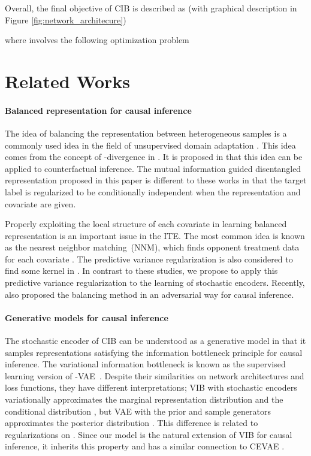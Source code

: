 \documentclass{article}
\begin{document}
    Overall, the final objective of CIB is described as (with graphical description in Figure \ref{fig:network_architecure})
    
    where  involves the following optimization problem
    

\section{Related Works}

\paragraph{Balanced representation for causal inference}

The idea of balancing the representation between heterogeneous samples is a commonly used idea in the field of unsupervised domain adaptation \cite{UDA15, tzeng2017adversarial, hoffman18}. This idea comes from the concept of -divergence in \cite{ben2010theory}. It is proposed in \cite{johansson16, Shalit17} that this idea can be applied to counterfactual inference. The mutual information guided disentangled representation proposed in this paper is different to these works in that the target label is regularized to be conditionally independent when the representation and covariate are given.
    
Properly exploiting the local structure of each covariate in learning balanced representation is an important issue in the ITE. The most common idea is known as the nearest neighbor matching~(NNM), which finds opponent treatment data for each covariate \cite{johansson16,li2017matching,yao2018}. The predictive variance regularization is also considered to find some kernel in \cite{Alaa17,jean2018semi}. In contrast to these studies, we propose to apply this predictive variance regularization to the learning of stochastic encoders. Recently, \cite{du2019adversarial} also proposed the  balancing method in an adversarial way for causal inference.
    
    


\paragraph{Generative models for causal inference}



    The stochastic encoder  of CIB can be understood as a generative model in that it samples representations satisfying the information bottleneck principle for causal inference. The variational information bottleneck \cite{Alemi17} is known as the supervised learning version of -VAE~\cite{Higgins17}. Despite their similarities on network architectures and loss functions, they have different interpretations; VIB with stochastic encoders variationally approximates the marginal representation distribution  and the conditional distribution , but VAE with the prior and sample generators approximates the posterior distribution . This difference is related to regularizations on . Since our model is the natural extension of VIB for causal inference, it inherits this property and has a similar connection to CEVAE \cite{Louizos17}. 
\end{document}

